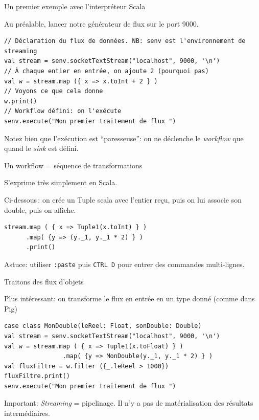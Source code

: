 \begin{frame}[fragile]{Un premier exemple avec l'interpréteur Scala}

Au préalable, lancer notre générateur de flux sur le port 9000.

\vfill

\begin{verbatim}
// Déclaration du flux de données. NB: senv est l'environnement de streaming
val stream = senv.socketTextStream("localhost", 9000, '\n')
// À chaque entier en entrée, on ajoute 2 (pourquoi pas)
val w = stream.map ({ x => x.toInt + 2 } )
// Voyons ce que cela donne
w.print()
// Workflow défini: on l'exécute
senv.execute("Mon premier traitement de flux ")
\end{verbatim}

\vfill

\begin{blocgauche}
Notez bien que l'exécution est ``paresseuse'': on ne déclenche le \textit{workflow} que quand le \textit{sink} est défini.
\end{blocgauche}
\end{frame}

\begin{frame}[fragile]{Un workflow = séquence de transformations}

S'exprime très simplement en Scala.

\vfill

Ci-dessous\,: on crée un Tuple scala avec l'entier reçu, puis on lui associe son double, puis
on affiche.

\vfill
\begin{verbatim}
stream.map ( { x => Tuple1(x.toInt) } )
      .map( {y => (y._1, y._1 * 2) } )
      .print()
\end{verbatim}

\vfill
\begin{blocgauche}
Astuce: utiliser \texttt{:paste} puis \texttt{CTRL D} pour entrer des commandes multi-lignes.
\end{blocgauche}
\end{frame}



\begin{frame}[fragile]{Traitons des flux d'objets}

Plus intéressant: on transforme le flux en entrée en un type donné (comme dans Pig)

\vfill

\begin{verbatim}
case class MonDouble(leReel: Float, sonDouble: Double)
val stream = senv.socketTextStream("localhost", 9000, '\n')
val w = stream.map ( { x => Tuple1(x.toFloat) } )
                .map( {y => MonDouble(y._1, y._1 * 2) } )
val fluxFiltre = w.filter ({_.leReel > 1000})
fluxFiltre.print()
senv.execute("Mon premier traitement de flux ")
\end{verbatim}

\vfill
\begin{blocgauche}
Important: \textit{Streaming} = pipelinage. \alert{Il n'y a pas de matérialisation des résultats intermédiaires}.
\end{blocgauche}
\end{frame}


